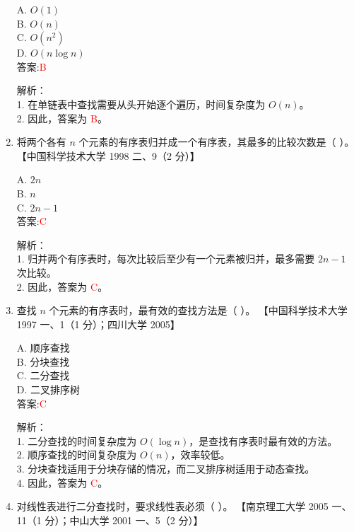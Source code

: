 \documentclass[lang=cn,newtx,10pt,scheme=chinese]{../../../elegantbook}
\begin{document}
\begin{enumerate}
    A. $O(1)$ \\  
    B. $O(n)$ \\  
    C. $O(n^2)$ \\  
    D. $O(n \log n)$ \\  

    答案:\textcolor{red}{B}

    解析：\\
    1. 在单链表中查找需要从头开始逐个遍历，时间复杂度为 $O(n)$。\\
    2. 因此，答案为 \textcolor{red}{B}。\\

\item 将两个各有 $n$ 个元素的有序表归并成一个有序表，其最多的比较次数是（ ）。  
    【中国科学技术大学 1998 二、9（2 分）】  

    A. $2n$ \\  
    B. $n$ \\  
    C. $2n-1$ \\  

    答案:\textcolor{red}{C}

    解析：\\
    1. 归并两个有序表时，每次比较后至少有一个元素被归并，最多需要 $2n-1$ 次比较。\\
    2. 因此，答案为 \textcolor{red}{C}。\\
    \item 查找 $n$ 个元素的有序表时，最有效的查找方法是（ ）。  
    【中国科学技术大学 1997 一、1（1 分）；四川大学 2005】  

    A. 顺序查找 \\  
    B. 分块查找 \\  
    C. 二分查找 \\  
    D. 二叉排序树 \\  

    答案:\textcolor{red}{C}

    解析：\\
    1. 二分查找的时间复杂度为 $O(\log n)$，是查找有序表时最有效的方法。\\
    2. 顺序查找的时间复杂度为 $O(n)$，效率较低。\\
    3. 分块查找适用于分块存储的情况，而二叉排序树适用于动态查找。\\
    4. 因此，答案为 \textcolor{red}{C}。\\

\item 对线性表进行二分查找时，要求线性表必须（ ）。  
    【南京理工大学 2005 一、11（1 分）；中山大学 2001 一、5（2 分）】  


\end{enumerate}
\end{document}

